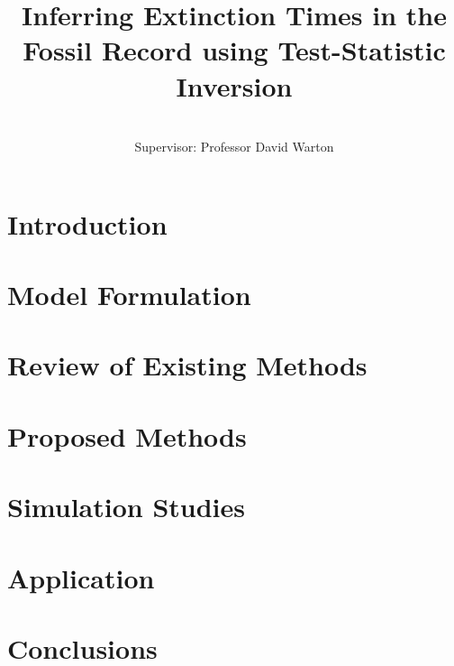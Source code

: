 \documentclass[honours,12pt]{UNSWthesis}
\title{Inferring Extinction Times in the Fossil Record using Test-Statistic Inversion}
\author{\Authornameonly\\{\bigskip}Supervisor: Professor David Warton}
\begin{document}
%
%

\beforepreface

\afterpage{\blankpage}



% 



\afterpreface

\afterpage{\blankpage}

%
%

\chapter{Introduction}\label{chap: intro}


\chapter{Model Formulation}\label{chap: assumptions}


\chapter{Review of Existing Methods}\label{chap: existing-methods}


\chapter{Proposed Methods}\label{chap: proposed-methods}


\chapter{Simulation Studies}\label{chap: simulation-experiments}


\chapter{Application}\label{chap: applications}


\chapter{Conclusions}\label{chap: conclusions}

\end{document}
